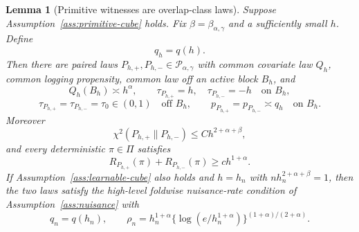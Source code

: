 \documentclass[11pt]{article}
\theoremstyle{definition}
\theoremstyle{plain}
\newtheorem{lemma}{Lemma}
\theoremstyle{remark}
\begin{document}
\begin{lemma}[Primitive witnesses are overlap-class laws]\label{lem:witness-membership}
Suppose Assumption~\ref{ass:primitive-cube} holds.  Fix
\(\beta=\beta_{\alpha,\gamma}\) and a sufficiently small \(h\).  Define
\[
q_h=q(h).
\]
Then there are paired laws \(P_{h,+},P_{h,-}\in\mathcal P_{\alpha,\gamma}\)
with common covariate law \(Q_h\), common logging propensity, common law off
an active block \(B_h\), and
\[
Q_h(B_h)\asymp h^\alpha,\qquad
\tau_{P_{h,+}}=h,\quad \tau_{P_{h,-}}=-h\quad\text{on }B_h,
\]
\[
\tau_{P_{h,+}}=\tau_{P_{h,-}}=\tau_0\in(0,1)\quad\text{off }B_h,\qquad
p_{P_{h,+}}=p_{P_{h,-}}\asymp q_h\quad\text{on }B_h.
\]
Moreover
\[
\chi^2(P_{h,+}\|P_{h,-})\le C h^{2+\alpha+\beta},
\]
and every deterministic \(\pi\in\Pi\) satisfies
\[
R_{P_{h,+}}(\pi)+R_{P_{h,-}}(\pi)\ge c h^{1+\alpha}.
\]
If Assumption~\ref{ass:learnable-cube} also holds and \(h=h_n\) with
\(n h_n^{2+\alpha+\beta}=1\), then the two laws satisfy the high-level
foldwise nuisance-rate condition of Assumption~\ref{ass:nuisance} with
\[
q_n=q(h_n),\qquad
\rho_n=h_n^{1+\alpha}\{\log(e/h_n^{1+\alpha})\}^{(1+\alpha)/(2+\alpha)}.
\]
\end{lemma}
\end{document}
